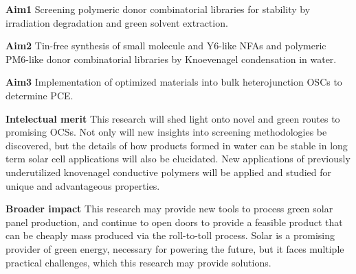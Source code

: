 \textbf{Aim1} Screening polymeric donor combinatorial libraries for stability by irradiation degradation and green solvent extraction.

\textbf{Aim2} Tin-free synthesis of small molecule and Y6-like NFAs and polymeric PM6-like
donor combinatorial libraries by Knoevenagel condensation in water.

\textbf{Aim3} Implementation of optimized materials into bulk heterojunction OSCs to determine PCE.

\textbf{Intelectual merit} This research will shed light onto novel and green routes to promising OCSs.
Not only will new insights into screening methodologies be discovered, but the details of how products formed in water can be stable in long term solar cell applications will also be elucidated.
New applications of previously underutilized knovenagel conductive polymers will be applied and studied for unique and advantageous properties.

\textbf{Broader impact} This research may provide new tools to process green solar panel production, and continue to open doors to provide a feasible product that can be cheaply mass produced via the roll-to-toll process.
Solar is a promising provider of green energy, necessary for powering the future, but it faces multiple practical challenges, which this research may provide solutions.
